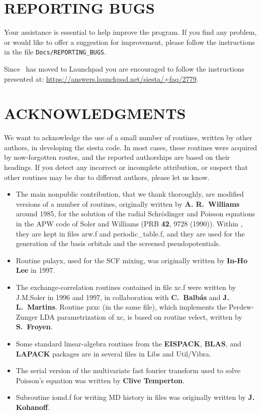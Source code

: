 \section{REPORTING BUGS}

Your assistance is essential to help improve the program. If you find
any problem, or would like to offer a suggestion for improvement,
please follow the instructions in the file
\texttt{Docs/REPORTING\_BUGS}. 

Since \siesta\ has moved to Launchpad you are encouraged to follow the
instructions presented at:
\url{https://answers.launchpad.net/siesta/+faq/2779}.



\section{ACKNOWLEDGMENTS}

We want to acknowledge the use of a small number of routines,
written by other authors, in developing the siesta code.
In most cases, these routines were acquired by now-forgotten
routes, and the reported authorships are based on their headings.
If you detect any incorrect or incomplete attribution, or suspect
that other routines may be due to different authors, please
let us know.

\begin{itemize}
\item
The main nonpublic contribution, that we thank thoroughly, are
modified versions of a number of routines, originally written by \textbf{A. R.\ Williams} around 1985, for the solution of the radial
Schr\"odinger and Poisson equations in the APW code of Soler and
Williams (PRB \textbf{42}, 9728 (1990)).  Within \siesta, they are
kept in files arw.f and periodic\_table.f, and they are used for the
generation of the basis orbitals and the screened pseudopotentials.

\item
Routine pulayx, used for the SCF mixing, was originally written by
\textbf{In-Ho Lee} in 1997.

\item
The exchange-correlation routines contained in file xc.f were written
by J.M.Soler in 1996 and 1997, in collaboration with \textbf{C.\ Balb\'as} and \textbf{J. L.\ Martins}.  Routine pzxc (in the same
file), which implements the Perdew-Zunger LDA parametrization of xc,
is based on routine velect, written by \textbf{S.\ Froyen}.

\item
Some standard linear-algebra routines from the \textbf{EISPACK}, \textbf{BLAS}, and \textbf{LAPACK} packages are in several files in Libs and
Util/Vibra.

\item
The serial version of the multivariate fast fourier transform used to
solve Poisson's equation was written by \textbf{Clive Temperton}.

\item
Subroutine iomd.f for writing MD history in files was originally
written by \textbf{J. Kohanoff}.
\end{itemize}

